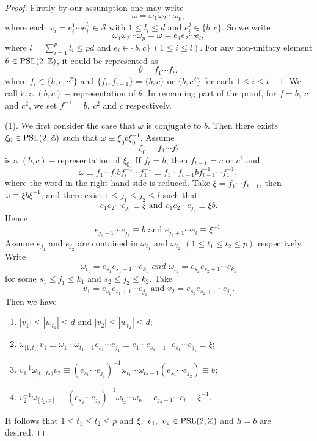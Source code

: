 \documentclass{amsart}
\theoremstyle{plain}
\theoremstyle{definition}
\theoremstyle{remark}
\begin{document}
    \begin{proof}
        Firstly by our assumption one may write
        \[\omega=\omega_1\omega_2\cdots\omega_p,\]
        where each $\omega_i=e_i^1\cdots e_i^{l_i}\in\mathcal{S}$ with $1\leq l_i\leq d$ and $e_i^j \in \{b,c\}$. So we write 
        $$\omega_1\omega_2\cdots\omega_p=\omega=e_1e_2\cdots e_l,$$
        where $l=\sum_{i=1}^{p}l_i\leq pd$ and $e_i\in\{b,c\}\ (1\leq i\leq l)$. For any non-unitary element $\theta\in\textnormal{PSL}(2,\mathbb{Z})$, it could be represented as 
        $$\theta=f_1\cdots f_t,$$
        where $f_i\in\{b,c,c^2\}$ and $\{f_i,f_{i+1}\}=\{b,c\}$ or $\{b,c^2\}$ for each $1\leq i\leq t-1$. We call it a $(b,c)-$representation of $\theta$.  In remaining part of the proof, for $f=b,\ c$ and $c^2$, we set $f^{-1}=b,\ c^2$ and $c$ respectively.
        
       (1). We first consider the case that $\omega$ is conjugate to $b$. Then there exists $\xi_0\in\textnormal{PSL}(2,\mathbb{Z})$  such that $\omega\equiv \xi_0 b \xi_0^{-1}$. Assume 
       $$\xi_0=f_1\cdots f_t$$
       is a $(b,c)-$representation of $\xi_0$. 
       If $f_t=b$, then $f_{t-1}=c$ or $c^2$ and  
       $$\omega\equiv f_1\cdots f_tbf_t^{-1}\cdots f_1^{-1}\equiv f_1\cdots f_{t-1}b f_{t-1}^{-1}\cdots f_1^{-1},$$
       where the word in the right hand side is reduced. Take $\xi=f_1\cdots f_{t-1}$, then $\omega\equiv \xi b \xi^{-1}$, and there exist $1\leq j_1\leq j_2\leq l$ such that 
        $$e_1e_2\cdots e_{j_1}\equiv \xi\text{ and }e_1e_2\cdots e_{j_2}\equiv \xi b.$$
        Hence 
        $$e_{j_1+1}\cdots e_{j_2}\equiv b\text{ and }e_{j_2+1}\cdots e_l\equiv \xi^{-1}.$$
        Assume $e_{j_1}$ and $e_{j_2}$ are contained in $\omega_{t_1}$ and $\omega_{t_2}$ $(1\leq t_1\leq t_2\leq p)$ respectively. Write 
        $$\omega_{t_1}=e_{s_1}e_{s_1+1}\cdots e_{k_1} \textit{ \ and \ } \omega_{t_2}=e_{s_2}e_{s_2+1}\cdots e_{k_2}$$
        for some $s_1\leq j_1\leq k_1$ and $s_2\leq j_2\leq k_2$.        Take $$v_1=e_{s_1}e_{s_1+1}\cdots e_{j_1} \text{ and }v_2=e_{s_2}e_{s_2+1}\cdots e_{j_2}.$$ Then we have 
        \begin{enumerate}
            \item $|v_1|\leq|w_{t_1}|\leq d\text{ and }|v_2|\leq|w_{t_2}|\leq d$;
            \item $\omega_{[1,t_1)}v_1\equiv\omega_1\cdots \omega_{t_1-1}e_{s_1}\cdots e_{j_1}\equiv e_1\cdots e_{s_1-1} \cdot e_{s_1}\cdots e_{j_1}\equiv \xi$;
            \item $
        v_1^{-1}\omega_{[t_1,t_2)}v_2\equiv (e_{s_1}\cdots e_{j_1})^{-1}\omega_{t_1}\cdots \omega_{t_2-1}(e_{s_2}\cdots e_{j_2})\equiv b;$
        \item $v_2^{-1}\omega_{[t_2,p]}\equiv (e_{s_2}\cdots e_{j_2})^{-1}\omega_{t_2}\cdots \omega_p\equiv e_{j_2+1}\cdots e_l\equiv \xi^{-1}$.
        \end{enumerate}
        It follows that $1\leq t_1\leq t_2\leq p$ and $\xi,\ v_1,\ v_2\in\textnormal{PSL}(2,\mathbb{Z})$ and $h=b$ are desired. 
        

\end{proof}
\end{document}
